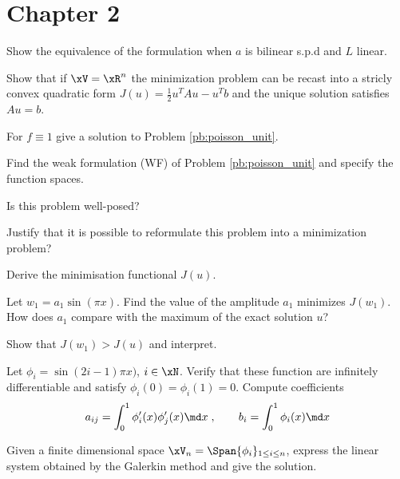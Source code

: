 
\section{Chapter 2}

\begin{tmasltn}{2.1}
\begin{tmatsks}
\item Show the equivalence of the formulation when $a$ is bilinear s.p.d and $L$ linear.
\item Show that if $\xV = \xR^n$ the minimization problem can be recast into a stricly convex quadratic form $J(u) = \frac{1}{2} u^T A u - u^T b$ and the unique solution satisfies $A u = b$.
\end{tmatsks}
\end{tmasltn}

\begin{tmasltn}{2.2}
\begin{tmatsks}
\item For $f \equiv 1$ give a solution to Problem \eqref{pb:poisson_unit}.
\item Find the weak formulation (WF) of Problem \eqref{pb:poisson_unit} and specify the function spaces.
\item Is this problem well-posed?
\item Justify that it is possible to reformulate this problem into a minimization problem?
\item Derive the minimisation functional $J(u)$.
\item Let $w_1 = a_1 \sin(\pi x)$. Find the value of the amplitude $a_1$ minimizes $J(w_1)$. How does $a_1$ compare with the maximum of the exact solution $u$?
\item Show that $J(w_1) > J(u)$ and interpret.
\item Let $\phi_i = \sin(2 i - 1) \pi x)$, $i\in\xN$. Verify that these function are infinitely differentiable and satisfy $\phi_i(0)= \phi_i(1)=0$. Compute coefficients
\begin{equation*}
a_{ij} = \int_0^1 \phi_i'(x) \phi_j'(x) \md x\;, \qquad b_i = \int_0^1 \phi_i(x) \md x
\end{equation*}
\item Given a finite dimensional space $\xV_n = \Span \lbrace \phi_i \rbrace_{1\leq i \leq n}$, express the linear system obtained by the Galerkin method and give the solution.
\end{tmatsks}
\end{tmasltn}

